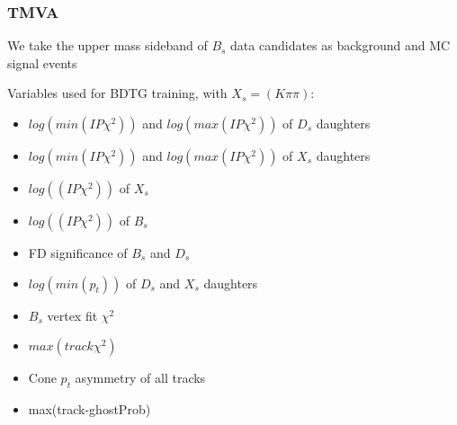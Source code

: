 \documentclass[]{beamer}
\begin{document}
%
%
%
%
%
%


\begin{frame}
\frametitle{TMVA}

We take the upper mass sideband of $B_{s}$ data candidates as background and MC signal events \newline

Variables used for BDTG training, with $X_{s} = (K\pi\pi)$:

\begin{itemize}

\item $log(min(IP\chi^{2}))$ and $log(max(IP\chi^{2}))$ of $D_{s}$ daughters

\item $log(min(IP\chi^{2}))$ and $log(max(IP\chi^{2}))$ of $X_{s}$ daughters

\item $log((IP\chi^{2}))$ of $X_{s}$

\item $log((IP\chi^{2}))$ of $B_{s}$

\item FD significance of $B_{s}$ and $D_{s}$

\item $log(min(p_{t}))$ of $D_{s}$ and $X_{s}$ daughters

\item $B_{s}$ vertex fit $\chi^{2}$ 

\item $max(track\chi^{2})$

\item Cone $p_{t}$ asymmetry of all tracks 

\item max(track-ghostProb)

\end{itemize}

\end{frame}
\end{document}
